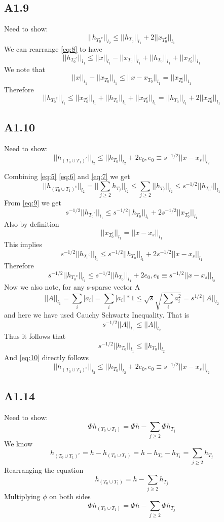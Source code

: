 \documentclass{article}
\newcommand{\lone}[1]{
  ||#1||_{l_1}
}
\newcommand{\ltwo}[1]{
  ||#1||_{l_2}
}
\newcommand{\htj}[1]{
  h_{T_{#1}}
}
\newcommand{\htc}[1]{
  h_{{#1}^c}
}
\newcommand{\hto}[1]{
  h_{#1}
}
\newcommand{\htzo}{
  h_{(T_0 \cup T_1)}
}
\newcommand{\htzoc}{
  h_{(T_0 \cup T_1)^c}
}
\begin{document}
\subsection*{A1.9}
Need to show:
\begin{equation}
  \label{eq:9}
  \ltwo{\htc{T_0}} \le \lone{\hto{T_0}} + 2\lone{x_{T_0^c}}
\end{equation}
We can rearrange \ref{eq:8} to have
$$\lone{\htc{T_0}} \le \lone{x} - \lone{x_{T_0}} + \lone{\hto{T_0}} + \lone{x_{T_0^c}}$$
We note that
$$\lone{x} - \lone{x_{T_0}} \le \lone{x - x_{T_0}} = \lone{x_{T_0^c}}$$
Therefore
$$\lone{\htc{T_0}} \le \lone{x_{T_0^c}} + \lone{\hto{T_0}} + \lone{x_{T_0^c}} = \lone{\hto{T_0}} + 2\lone{x_{T_0^c}}$$

\subsection*{A1.10}
Need to show:
\begin{equation}
  \label{eq:10}
  \ltwo{\htzoc} \le \ltwo{\hto{T_0}} + 2e_0, e_0 \equiv s^{-1/2}\ltwo{x - x_s}
\end{equation}

Combining \ref{eq:5} \ref{eq:6} and \ref{eq:7} we get
$$\ltwo{\htzoc} = \ltwo{\sum_{j \ge 2}\htj{j}} \le \sum_{j \ge 2} \ltwo{\htj{j}} \le s^{-1/2}\lone{\htc{T_0}}$$
From \ref{eq:9} we get
$$s^{-1/2}\lone{\htc{T_0}} \le s^{-1/2}\lone{\hto{T_0}} + 2s^{-1/2}\lone{x_{T_0^c}}$$
Also by definition
$$\lone{x_{T_0^c}} = \lone{x - x_s}$$
This implies
$$s^{-1/2}\lone{\htc{T_0}} \le s^{-1/2}\lone{\hto{T_0}} + 2s^{-1/2}\lone{x - x_s}$$
Therefore
$$s^{-1/2}\lone{\htc{T_0}} \le s^{-1/2}\lone{\hto{T_0}} + 2e_0, e_0 \equiv s^{-1/2}\ltwo{x - x_s}$$
Now we also note, for any s-sparse vector A
$$\lone{A} = \sum_i|a_i| = \sum_i |a_i|*1 \le \sqrt{s}\sqrt{\sum_i a_i^2} = s^{1/2}\ltwo{A}$$
and here we have used Cauchy Schwartz Inequality.
That is
$$s^{-1/2}\lone{A} \le \ltwo{A}$$
Thus it follows that 
$$s^{-1/2}\lone{\hto{T_0}} \le \ltwo{\hto{T_0}}$$
And \ref{eq:10} directly follows
$$\ltwo{\htzoc} \le \ltwo{\hto{T_0}} + 2e_0, e_0 \equiv s^{-1/2}\ltwo{x - x_s}$$

\subsection*{A1.14}
Need to show:
\begin{equation}
  \label{eq:14}
  \Phi \htzo = \Phi h - \sum_{j \ge 2}\Phi \htj{j}
\end{equation}
We know
$$\htzoc = h - \htzo =h - \hto{T_o} - \hto{T_1} = \sum_{j \ge 2}\htj{j}$$
Rearranging the equation
$$\htzo = h - \sum_{j \ge 2}\htj{j}$$
Multiplying $\phi$ on both sides
$$\Phi \htzo = \Phi h - \sum_{j \ge 2}\Phi \htj{j}$$
\end{document}
